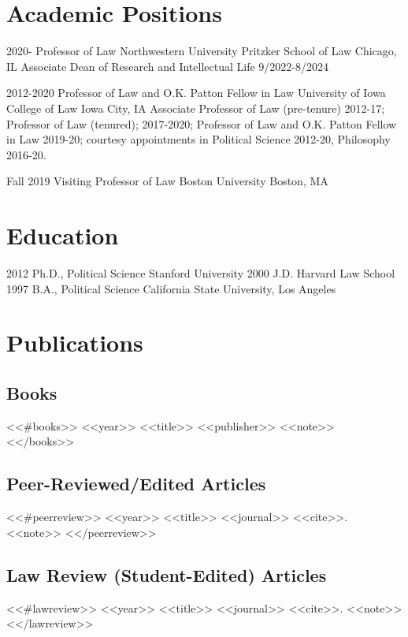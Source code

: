 \documentclass[letterpaper]{moderncv}
\begin{document}
\makecvtitle

\lfoot{\thepage}

%
%
\section{Academic Positions}
\cventry
{2020-}
{Professor of Law}
{Northwestern University Pritzker School of Law}
{Chicago, IL}
{}
{Associate Dean of Research and Intellectual Life 9/2022-8/2024}

\cventry
{2012-2020}
{Professor of Law and O.K. Patton Fellow in Law}
{University of Iowa College of Law}
{Iowa City, IA}
{}
{Associate Professor of Law (pre-tenure) 2012-17; Professor of Law (tenured); 2017-2020; Professor of Law and O.K. Patton Fellow in Law 2019-20; courtesy appointments in Political Science 2012-20, Philosophy 2016-20.}
%

\cventry
{Fall 2019}
{Visiting Professor of Law}
{Boston University}
{Boston, MA}
{}
{}


%
%
\section{Education}
\cventry
{2012}
{Ph.D., Political Science}
{Stanford University}
{}
{}
{}
\cventry
{2000}
{J.D.}
{Harvard Law School}
{}
{}
{}
\cventry
{1997}
{B.A., Political Science}
{California State University, Los Angeles}
{}
{}
{}
%
%
\section{Publications}
\subsection{Books}
<<#books>>
\cventry
{<<year>>}
{<<title>>}
{}
{<<publisher>>}
{}
{<<note>>}
\vspace{1mm}
<</books>>
\vspace{1mm}
\subsection{Peer-Reviewed/Edited Articles}
<<#peerreview>>
\cventry
{<<year>>}
{<<title>>}
{}
{<<journal>>}
{}
{<<cite>>. <<note>>}
\vspace{1mm}
<</peerreview>>
\vspace{1mm}
\subsection{Law Review (Student-Edited) Articles}
<<#lawreview>>
\cventry
{<<year>>}
{<<title>>}
{}
{<<journal>>}
{}
{<<cite>>. <<note>>}
\vspace{1mm}
<</lawreview>>
\vspace{1mm}
\end{document}
